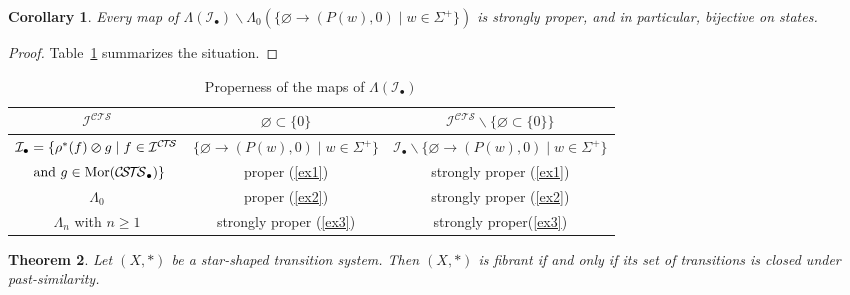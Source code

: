 \documentclass[a4paper,12pt]{amsart}
\newtheorem{thm}{Theorem}[section]
\newtheorem{cor}[thm]{Corollary}
\begin{document}
\begin{cor} \label{ex4} Every map of $\Lambda({\mathcal{I}}_\bullet) \backslash
  \Lambda_0(\{\varnothing \to (P(w),0)\mid w \in \Sigma^+\})$ is strongly
  proper, and in particular, bijective on states.
\end{cor}

\begin{proof} Table~\ref{properness} summarizes the situation. \end{proof}

\begin{table}
{\small
\begin{tabular}{|c|c|c|}
\hline
 ${\mathcal{I}}^{\mathcal{C\!T\!S}}$ & $\varnothing \subset \{0\}$ & ${\mathcal{I}}^{\mathcal{C\!T\!S}}\backslash \{\varnothing \subset \{0\}\}$\\
\hline
 ${\mathcal{I}}_\bullet=\{\rho^*(f) \varoslash g\mid f\in {\mathcal{I}}^{\mathcal{C\!T\!S}}$& $\{\varnothing \to (P(w),0)\mid w \in \Sigma^+\}$&${\mathcal{I}}_\bullet\backslash\{\varnothing \to
(P(w),0)\mid w \in \Sigma^+\}$ \\ 
$ \hbox{ and }g\in \operatorname{Mor}({\mathcal{C\!S\!T\!S}}_\bullet)\}$& proper (\ref{ex1}) & strongly proper (\ref{ex1})\\
\hline
 $\Lambda_0$ & proper (\ref{ex2}) & strongly proper (\ref{ex2}) \\
\hline
 $\Lambda_n$ with $n{\geqslant} 1$ & strongly proper (\ref{ex3}) &  strongly proper(\ref{ex3})  \\
\hline
\end{tabular}
}
\caption{Properness of the maps of $\Lambda({\mathcal{I}}_\bullet)$}
\label{properness}
\end{table}

\begin{thm} \label{fib-carac} Let $(X,*)$ be a star-shaped transition
system. Then $(X,*)$ is fibrant if and only if its set of transitions
is closed under past-similarity. \end{thm}
\end{document}
